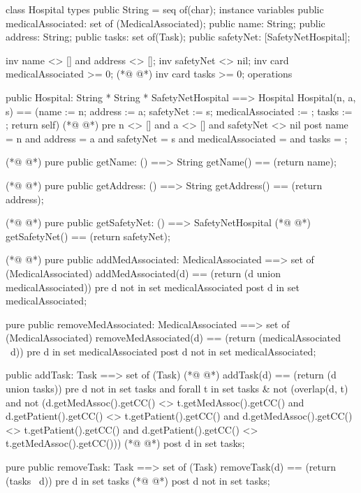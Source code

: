 \begin{vdmpp}[breaklines=true]
class Hospital
types
 public String = seq of(char);
instance variables
  public medicalAssociated: set of (MedicalAssociated);
  public name: String;
  public address: String;
  public tasks: set of(Task);
  public safetyNet: [SafetyNetHospital];
 
 inv name <> [] and address <> [];
 inv safetyNet <> nil; 
 inv card medicalAssociated >= 0;
(*@
\label{Hospital:14}
@*)
 inv card tasks >= 0;
operations

 public Hospital: String * String * SafetyNetHospital ==> Hospital
  Hospital(n, a, s) == (name := n; address := a; safetyNet := s; medicalAssociated := {}; tasks := {}; return self)
(*@
\label{getName:19}
@*)
 pre n <> [] and a <> [] and safetyNet <> nil
 post name = n and address = a and safetyNet = s and medicalAssociated = {} and tasks = {};
 
(*@
\label{getAddress:22}
@*)
 pure public getName: () ==> String
  getName() == (return name);
 
(*@
\label{getMedicalAssociated:25}
@*)
 pure public getAddress: () ==> String
  getAddress() == (return address);
  
(*@
\label{getTasks:28}
@*)
 pure public getSafetyNet: () ==> SafetyNetHospital
(*@
\label{getSafetyNet:29}
@*)
  getSafetyNet() == (return safetyNet);
 
(*@
\label{getMedAssociated:31}
@*)
 pure public addMedAssociated: MedicalAssociated ==> set of (MedicalAssociated)
  addMedAssociated(d) == (return ({d} union medicalAssociated))
 pre d not in set medicalAssociated
 post d in set medicalAssociated;
  
 pure public removeMedAssociated: MedicalAssociated ==> set of (MedicalAssociated)
  removeMedAssociated(d) == (return (medicalAssociated \ {d}))
 pre d in set medicalAssociated
 post d not in set medicalAssociated;
 
 public addTask: Task ==> set of (Task)
(*@
\label{addMedAssociated:42}
@*)
  addTask(d) == (return ({d} union tasks))
 pre d not in set tasks and forall t in set tasks & 
  not (overlap(d, t) and not (d.getMedAssoc().getCC() <> t.getMedAssoc().getCC() and 
    d.getPatient().getCC() <> t.getPatient().getCC() and d.getMedAssoc().getCC() <> t.getPatient().getCC()
    and d.getPatient().getCC() <> t.getMedAssoc().getCC()))
(*@
\label{removeMedAssociated:47}
@*)
 post d in set tasks;
  
 pure public removeTask: Task ==> set of (Task)
  removeTask(d) == (return (tasks \ {d}))
 pre d in set tasks
(*@
\label{addTask:52}
@*)
 post d not in set tasks;
 

\end{vdmpp}
